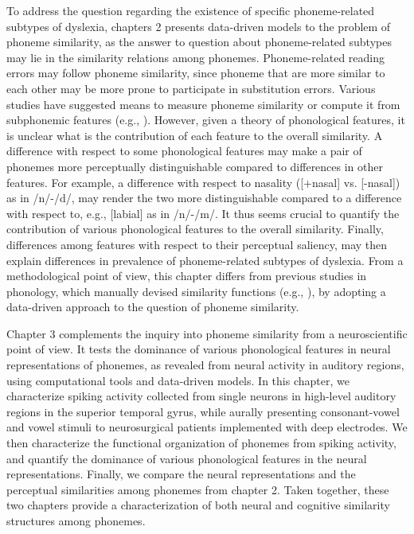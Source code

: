 To address the question regarding the existence of specific phoneme-related subtypes of dyslexia, chapters 2 presents data-driven models to the problem of phoneme similarity, as the answer to question about phoneme-related subtypes may lie in the similarity relations among phonemes. Phoneme-related reading errors may follow phoneme similarity, since phoneme that are more similar to each other may be more prone to participate in substitution errors. Various studies have suggested means to measure phoneme similarity \citep{NicelyMiller1955} or compute it from subphonemic features (e.g., \citealp{Pierrehumbert1993}). However, given a theory of phonological features, it is unclear what is the contribution of each feature to the overall similarity. A difference with respect to some phonological features may make a pair of phonemes more perceptually distinguishable compared to differences in other features. For example, a difference with respect to nasality ([+nasal] vs. [-nasal]) as in /n/-/d/, may render the two more distinguishable compared to a difference with respect to, e.g., [labial] as in /n/-/m/. It thus seems crucial to quantify the contribution of various phonological features to the overall similarity. Finally, differences among features with respect to their perceptual saliency, may then explain differences in prevalence of phoneme-related subtypes of dyslexia. From a methodological point of view, this chapter differs from previous studies in phonology, which manually devised similarity functions (e.g., \citealp{Frisch1997}), by adopting a data-driven approach to the question of phoneme similarity.

Chapter 3 complements the inquiry into phoneme similarity from a neuroscientific point of view. It tests the dominance of various phonological features in neural representations of phonemes, as revealed from neural activity in auditory regions, using computational tools and data-driven models. In this chapter, we characterize spiking activity collected from single neurons in high-level auditory regions in the superior temporal gyrus, while aurally presenting consonant-vowel and vowel stimuli to neurosurgical patients implemented with deep electrodes. We then characterize the functional organization of phonemes from spiking activity, and quantify the dominance of various phonological features in the neural representations. Finally, we compare the neural representations and the perceptual similarities among phonemes from chapter 2. Taken together, these two chapters provide a characterization of both neural and cognitive similarity structures among phonemes.